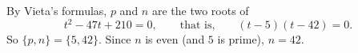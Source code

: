 By Vieta's formulas, $p$ and $n$ are the two roots of
\[t^2-47t+210=0,\qquad\text{that is,}\qquad (t-5)(t-42)=0 .\]
So $\{p,n\}=\{5,42\}$. Since $n$ is even (and $5$ is prime), $n=\boxed{42}$.
